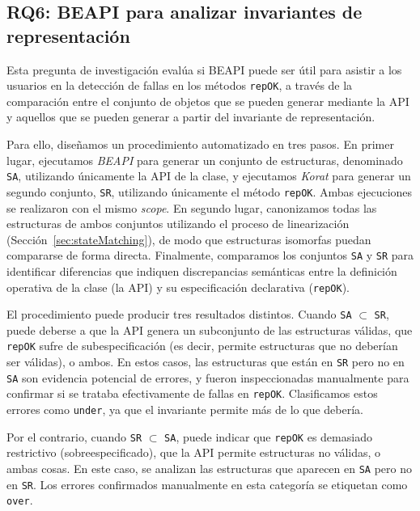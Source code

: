 



\subsection{RQ6: BEAPI para analizar invariantes de representación}
\label{sec:existing-specs-analysis}

Esta pregunta de investigación evalúa si \textsf{BEAPI} puede ser útil para asistir a los usuarios 
en la detección de fallas en los métodos \texttt{repOK}, a través de la comparación entre el conjunto 
de objetos que se pueden generar mediante la API y aquellos que se pueden generar a partir del 
invariante de representación.

Para ello, diseñamos un procedimiento automatizado en tres pasos. En primer lugar, ejecutamos 
\emph{BEAPI} para generar un conjunto de estructuras, denominado \texttt{SA}, utilizando únicamente 
la API de la clase, y ejecutamos \emph{Korat} para generar un segundo conjunto, \texttt{SR}, 
utilizando únicamente el método \texttt{repOK}. Ambas ejecuciones se realizaron con el mismo 
\emph{scope}. En segundo lugar, canonizamos todas las estructuras de ambos conjuntos utilizando el 
proceso de linearización (Sección~\ref{sec:stateMatching}), de modo que estructuras isomorfas puedan 
compararse de forma directa. Finalmente, comparamos los conjuntos \texttt{SA} y \texttt{SR} para 
identificar diferencias que indiquen discrepancias semánticas entre la definición operativa de la 
clase (la API) y su especificación declarativa (\texttt{repOK}).

El procedimiento puede producir tres resultados distintos. Cuando \texttt{SA} $\subset$ \texttt{SR}, 
puede deberse a que la API genera un subconjunto de las estructuras válidas, que \texttt{repOK} 
sufre de subespecificación (es decir, permite estructuras que no deberían ser válidas), o ambos. 
En estos casos, las estructuras que están en \texttt{SR} pero no en \texttt{SA} son evidencia potencial 
de errores, y fueron inspeccionadas manualmente para confirmar si se trataba efectivamente de fallas 
en \texttt{repOK}. Clasificamos estos errores como \texttt{under}, ya que el invariante permite más 
de lo que debería.

Por el contrario, cuando \texttt{SR} $\subset$ \texttt{SA}, puede indicar que \texttt{repOK} es demasiado 
restrictivo (sobreespecificado), que la API permite estructuras no válidas, o ambas cosas. En este 
caso, se analizan las estructuras que aparecen en \texttt{SA} pero no en \texttt{SR}. Los errores 
confirmados manualmente en esta categoría se etiquetan como \texttt{over}.

